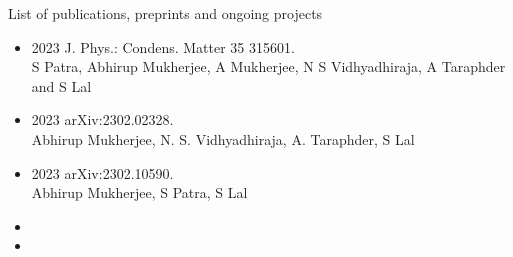 \documentclass[10pt,aspectratio=169]{beamer}
\begin{document}
\begin{frame}{List of publications, preprints and ongoing projects}
{\begin{minipage}{0.53\textwidth}
\begin{itemize}
	\item[\Checkmark] 2023 \alert{J. Phys.: Condens. Matter} 35 315601.\\[5pt] S Patra, \alert{Abhirup Mukherjee}, A Mukherjee, N S Vidhyadhiraja, A Taraphder and S Lal
\end{itemize}
\end{minipage}
\begin{minipage}{0.45\textwidth}
\begin{itemize}
	\item 2023 \alert{arXiv:2302.02328}.\\[5pt] \alert{Abhirup Mukherjee}, N. S. Vidhyadhiraja, A. Taraphder, S Lal\\[5pt]
	\item 2023 \alert{arXiv:2302.10590}.\\[5pt] \alert{Abhirup Mukherjee}, S Patra, S Lal
\end{itemize}
\end{minipage}
\vspace*{\fill}
\begin{itemize}
	\item {}
	\item {}
\end{itemize}
}
\end{frame}
\end{document}
